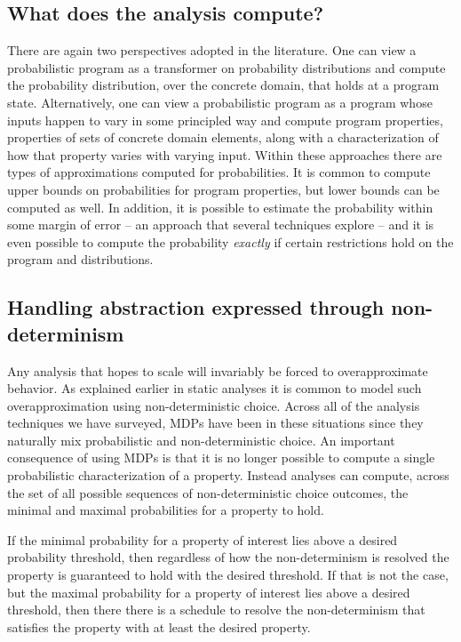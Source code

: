 \subsection{What does the analysis compute?}
There are again two perspectives adopted in the literature.
One can view a probabilistic program as a transformer on probability
distributions and compute the probability distribution, over the
concrete domain, that holds at a program state.
Alternatively, one can view a probabilistic program as a program 
whose inputs happen
to vary in some principled way and compute program properties, 
properties of sets of concrete domain elements, along with a characterization
of how that property varies with varying input.
Within these approaches there are types of approximations
computed for probabilities.  It is common to compute upper bounds
on probabilities for program properties, but lower bounds can 
be computed as well.  In addition, it is possible to estimate the
probability within some margin of error -- an approach that several
techniques explore -- and it is even possible to compute the probability
\textit{exactly} if certain restrictions hold on the program and distributions.



\subsection{Handling abstraction expressed through non-determinism}
Any analysis that hopes to scale will invariably be forced to overapproximate
behavior.  As explained earlier in static analyses it is common
to model such overapproximation using non-deterministic choice.
Across all of the analysis techniques we have surveyed, MDPs
have been in these situations since they naturally mix probabilistic
and non-deterministic choice.   
An important consequence of using MDPs is that it is no longer possible
to compute a single probabilistic characterization of a property.
Instead analyses can compute, across the set of all possible sequences
of non-deterministic choice outcomes, the minimal and maximal 
probabilities for a property to hold.

If the minimal probability for a property of interest lies above 
a desired probability threshold, then regardless of how the non-determinism
is resolved the property is guaranteed to hold with the desired 
threshold.  If that is not the case, but the maximal probability for
a property of interest lies above a desired threshold, then there
there is a schedule to resolve the non-determinism that satisfies
the property with at least the desired property.

